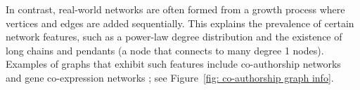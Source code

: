 \documentclass[twoside,11pt]{article}
\theoremstyle{remark}
\begin{document}


In contrast, real-world networks are often formed from a growth process where vertices and edges are
added sequentially. This explains the prevalence of certain network features, such as a power-law degree distribution \citep{barabasi1999emergence} and the existence of long chains and pendants (a node that connects to many degree 1 nodes). Examples of graphs that exhibit such features include co-authorship networks \citep{ji2016coauthorship} and gene co-expression networks \citep{cline2007integration}; see Figure~\ref{fig: co-authorship graph info}. 
\end{document}
